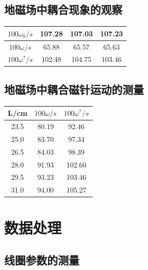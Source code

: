 \documentclass[a4paper]{ltxdoc}
\begin{document}
\begin{multicols}{2}
    \subsection{地磁场中耦合现象的观察}

    \begin{tabular}{|c|c|c|c|}
        \hline
        $100\omega_0/s$   & 107.28 & 107.03 & 107.23 \\\hline
        $100\omega/s$     & 65.88  & 65.57  & 65.63  \\\hline
        $100\omega^{*}/s$ & 102.48 & 104.75 & 103.46 \\\hline
    \end{tabular}

    \subsection{地磁场中耦合磁针运动的测量}

    \begin{tabular}{|c|c|c|}
        \hline
        L/cm & $100\omega/s$ & $100\omega^{*}/s$ \\\hline
        23.5 & 80.19         & 92.46             \\\hline
        25.0 & 83.70         & 97.34             \\\hline
        26.5 & 84.03         & 98.39             \\\hline
        28.0 & 91.93         & 102.60            \\\hline
        29.5 & 93.23         & 103.46            \\\hline
        31.0 & 94.00         & 105.27            \\\hline
    \end{tabular}

    \section{数据处理}

    \subsection{线圈参数的测量}


\end{multicols}
\end{document}
